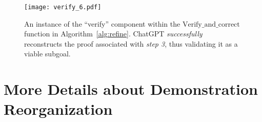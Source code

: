 \documentclass{article}
\begin{document}
\begin{figure*}
    \centering
    \texttt{[image: verify\_6.pdf]}
    \caption{An instance of the ``verify'' component within the $\mathrm{Verify\_and\_correct}$ function in Algorithm~\ref{alg:refine}.  ChatGPT \emph{successfully} reconstructs the proof associated with \emph{step 3}, thus validating it as a viable subgoal.}
    \label{fig:verify_6}
\end{figure*}






\clearpage
\section{More Details about Demonstration Reorganization}
\label{sec:appendix_diff}
\end{document}
